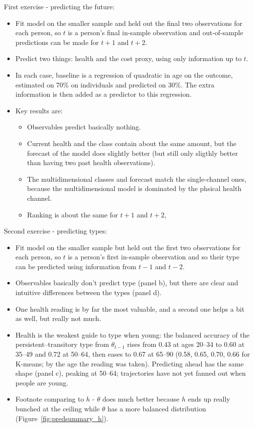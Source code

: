\documentclass[11pt]{article}
\begin{document}
	
	First exercise - predicting the future: 
	\begin{itemize}
		\item Fit model on the smaller sample and held out the final two observations for each person, so $t$ is a person's final in-sample observation and out-of-sample predictions can be made for $t+1$ and $t+2$.
		\item Predict two things: health and the cost proxy, using only information up to $t$. 
		\item In each case, baseline is a regression of quadratic in age on the outcome, estimated on 70\% on individuals and predicted on 30\%. The extra information is then added as a predictor to this regression. 
		\item Key results are:
		\begin{itemize}
			\item Observables predict basically nothing.
			\item Current health and the class contain about the same amount, but the forecast of the model does slightly better (but still only sligthly better than having two past health observations).  
			\item The multidimensional classes and forecast match the single-channel ones, because the multidimensional model is dominated by the phsical health channel.
			\item Ranking is about the same for $t+1$ and $t+2$,
		\end{itemize}
	\end{itemize}
	
	
	Second exercise - predicting types:
	\begin{itemize}
		\item Fit model on the smaller sample but held out the first two observations for each person, so $t$ is a person's first in-sample observation and so their type can be predicted using information from $t-1$ and $t-2$.
		\item Observables basically don't predict type (panel b), but there are clear and intuitive differences between the types (panel d). 
		\item One health reading is by far the most valuable, and a second one helps a bit as well, but really not much.
		\item Health is the weakest guide to type when young: the balanced accuracy of the persistent--transitory type from $\theta_{t-1}$ rises from 0.43 at ages 20--34 to 0.60 at 35--49 and 0.72 at 50--64, then eases to 0.67 at 65--90 (0.58, 0.65, 0.70, 0.66 for K-means; by the age the reading was taken). Predicting ahead has the same shape (panel c), peaking at 50--64; trajectories have not yet fanned out when people are young.
		\item Footnote comparing to $h$ - $\theta$ does much better because $h$ ends up really bunched at the ceiling while $\theta$ has a more balanced distribution (Figure~\ref{fig:predsummary_h}). 
	\end{itemize}
	
\end{document}
